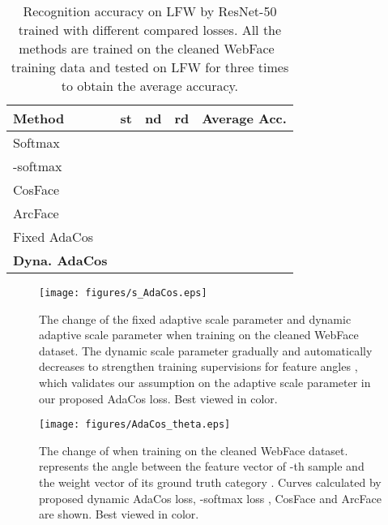 \documentclass[10pt,twocolumn,letterpaper]{article}
\begin{document}
\begin{table}
\begin{center}
\begin{tabular}{|l|c|c|c|c|}
\hline
Method & st & nd & rd& Average Acc. \\
\hline\hline
Softmax      &  & & & \\
-softmax~\cite{L2-softmax} &  & & & \\
CosFace~\cite{CosFace}      &  & & & \\
ArcFace~\cite{ArcFace}      &  & & & \\
\hline
Fixed AdaCos&  & & & \\
\bf{Dyna. AdaCos}     &  & & & \\
\hline
\end{tabular}
\end{center}
\caption{ Recognition accuracy on LFW by ResNet-50 trained with different compared losses. All the methods are trained on the cleaned WebFace~\cite{WebFace} training data and tested on LFW for three times to obtain the average accuracy.}
\label{tab:lfw_benchmark}

\end{table}

\begin{figure}[t]
\begin{center}
   \texttt{[image: figures/s\_AdaCos.eps]}
\end{center}
   \caption{ The change of the fixed adaptive scale parameter  and dynamic adaptive scale parameter  when training on the cleaned WebFace dataset. The dynamic scale parameter  gradually and automatically decreases to strengthen training supervisions for feature angles , which validates our assumption on the adaptive scale parameter in our proposed AdaCos loss. Best viewed in color.
    }
\label{fig:s_AdaCos}

\end{figure}


\begin{figure}[t]
\begin{center}
   \texttt{[image: figures/AdaCos\_theta.eps]}
\end{center}
   \caption{ 
         The change of  when training on the cleaned WebFace dataset.  represents the angle between the feature vector of -th sample  and the weight vector of its ground truth  category . Curves calculated by proposed dynamic AdaCos loss, -softmax loss \cite{L2-softmax}, CosFace \cite{CosFace} and ArcFace \cite{ArcFace} are shown. Best viewed in color.
    }
\label{fig:theta_AdaCos}

\end{figure}
\end{document}
